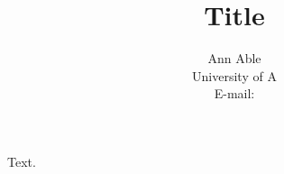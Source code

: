 \documentclass[aps]{revtex4-2}
\begin{document}
\title{Title}
\author{Ann Able \\ University of A \\ E-mail: }
\maketitle
Text.
\end{document}
